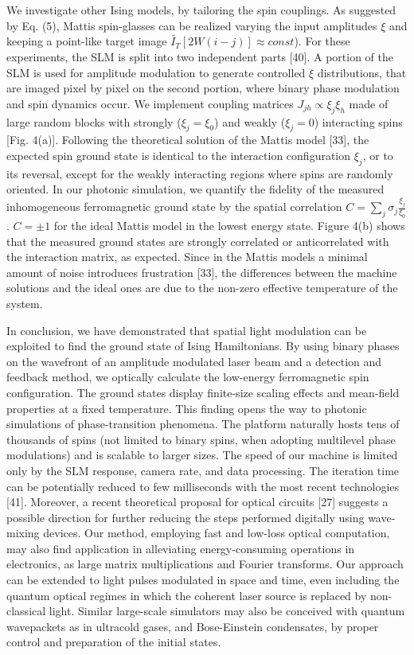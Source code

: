 We investigate other Ising models, by tailoring the spin couplings. As suggested by Eq. (5), Mattis spin-glasses can be realized varying the input amplitudes $\xi$ and keeping a point-like target image $\tilde{I_T}[2W(i-j)] \approx const$). For these experiments, the SLM is split into two independent parts [40]. A portion of the SLM is used for amplitude modulation to generate controlled 
$\xi$ distributions, that are imaged pixel by pixel on the second portion, where binary phase modulation and spin dynamics occur. We implement coupling matrices $J_{jh} \propto \xi_j \xi_h $ made of large random blocks with strongly ($\xi_j = \xi_0$) and weakly ($\xi_j = 0$) interacting spins [Fig. 4(a)]. Following the theoretical solution of the Mattis model [33], the expected spin ground state is identical to the interaction configuration $\xi_j$, or to its reversal, except for the weakly interacting regions where spins are randomly oriented. In our photonic simulation, we quantify the fidelity of the measured inhomogeneous ferromagnetic ground state by the spatial correlation $C = \sum_j \sigma_j \frac{\xi_j}{\xi_0}$. $C = \pm 1$ for the ideal Mattis model in the lowest energy state. Figure 4(b) shows that the measured ground states are strongly correlated or anticorrelated with the interaction matrix, as expected. Since in the Mattis models a minimal amount of noise introduces frustration [33], the differences between the machine solutions and the ideal ones are due to the non-zero effective temperature of the system.

In conclusion, we have demonstrated that spatial light modulation can be exploited to find the ground state of Ising Hamiltonians. By using binary phases on the wavefront of an amplitude modulated laser beam and a detection and feedback method, we optically calculate the low-energy ferromagnetic spin configuration. The ground states display finite-size scaling effects and mean-field properties at a fixed temperature. This finding opens the way to photonic simulations of phase-transition phenomena. The platform naturally hosts tens of thousands of spins (not limited to binary spins, when adopting multilevel phase modulations) and is scalable to larger sizes. The speed of our machine is limited only by the SLM response, camera rate, and data processing. The iteration time can be potentially reduced to few milliseconds with the most recent technologies [41]. Moreover, a recent theoretical proposal for optical circuits [27] suggests a possible direction for further reducing the steps performed digitally using wave-mixing devices. Our method, employing fast and low-loss optical computation, may also
find application in alleviating energy-consuming operations
in electronics, as large matrix multiplications and
Fourier transforms. Our approach can be extended to
light pulses modulated in space and time, even including
the quantum optical regimes in which the coherent
laser source is replaced by non-classical light. Similar
large-scale simulators may also be conceived with quantum
wavepackets as in ultracold gases, and Bose-Einstein
condensates, by proper control and preparation of the
initial states.